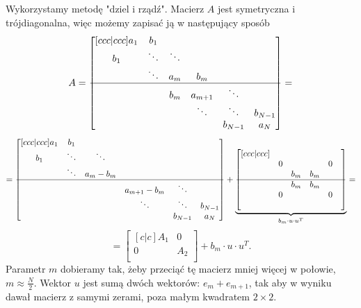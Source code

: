 \documentclass[a4paper,12pt]{article}
\begin{document}
Wykorzystamy metodę "dziel i rządź". Macierz $A$ jest symetryczna i trójdiagonalna, więc możemy zapisać ją w następujący sposób
$$
    A = \begin{bmatrix}[ccc|ccc]
        a_1 & b_1    &        &           &           &           \\
        b_1 & \ddots & \ddots &           &           &           \\
            & \ddots & a_m    & b_m       &           &           \\
        \hline
            &        & b_m    & a_{m + 1} & \ddots    &           \\
            &        &        & \ddots    & \ddots    & b_{N - 1} \\
            &        &        &           & b_{N - 1} & a_N
    \end{bmatrix}
    = $$$$ =
    \begin{bmatrix}[ccc|ccc]
        a_1 & b_1    &           &                 &           &           \\
        b_1 & \ddots & \ddots    &                 &           &           \\
            & \ddots & a_m - b_m &                 &           &           \\
        \hline
            &        &           & a_{m + 1} - b_m & \ddots    &           \\
            &        &           & \ddots          & \ddots    & b_{N - 1} \\
            &        &           &                 & b_{N - 1} & a_N
    \end{bmatrix}
    +
    \underbrace{
        \begin{bmatrix}[ccc|ccc]
             &   &     &     &   & \\
             & 0 &     &     & 0 & \\
             &   & b_m & b_m &   & \\
            \hline
             &   & b_m & b_m &   & \\
             & 0 &     &     & 0 & \\
             &   &     &     &   &
        \end{bmatrix}
    }_{b_m \cdot u \cdot u^T}
    = $$$$ =
    \begin{bmatrix}[c|c]
        A_1 & 0   \\
        \hline
        0   & A_2 \\
    \end{bmatrix}
    + b_m \cdot u \cdot u^T.
$$
Parametr $m$ dobieramy tak, żeby przeciąć tę macierz mniej więcej w połowie, $m \approx \frac{N}{2}$.
Wektor $u$ jest sumą dwóch wektorów: $e_m + e_{m+1}$, tak aby w wyniku dawał macierz z samymi zerami,
poza małym kwadratem $2\times 2$.
\end{document}
